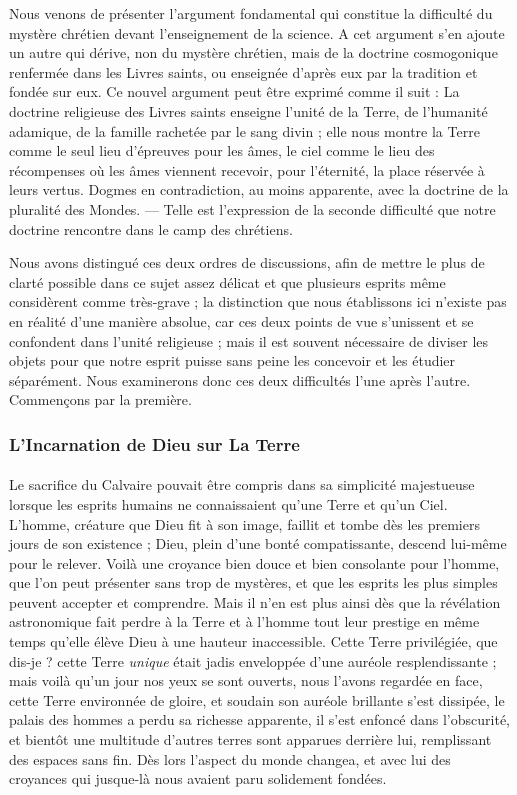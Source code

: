 \documentclass[a4paper, 11pt, oneside, landscape]{article}
\begin{document}
Nous venons de présenter l'argument fondamental qui constitue la difficulté du mystère chrétien devant l'enseignement de la science. A cet argument s'en ajoute un autre qui dérive, non du mystère chrétien, mais de la doctrine cosmogonique renfermée dans les Livres saints, ou enseignée d'après eux par la tradition et fondée sur eux. Ce nouvel argument peut être exprimé comme il suit : La doctrine religieuse des Livres saints enseigne l'unité de la Terre, de l'humanité adamique, de la famille rachetée par le sang divin ; elle nous montre la Terre comme le seul lieu d'épreuves pour les âmes, le ciel comme le lieu des récompenses où les âmes viennent recevoir, pour l'éternité, la place réservée à leurs vertus. Dogmes en contradiction, au moins apparente, avec la doctrine de la pluralité des Mondes. --- Telle est l'expression de la seconde difficulté que notre doctrine rencontre dans le camp des chrétiens.

Nous avons distingué ces deux ordres de discussions, afin de mettre le plus de clarté possible dans ce sujet assez délicat et que plusieurs esprits même considèrent comme très-grave ; la distinction que nous établissons ici n'existe pas en réalité d'une manière absolue, car ces deux points de vue s'unissent et se confondent dans l'unité religieuse ; mais il est souvent nécessaire de diviser les objets pour que notre esprit puisse sans peine les concevoir et les étudier séparément. Nous examinerons donc ces deux difficultés l'une après l'autre. Commençons par la première.

\subsubsection{L'Incarnation de Dieu sur La Terre}
\paragraph{}
Le sacrifice du Calvaire pouvait être compris dans sa simplicité majestueuse lorsque les esprits humains ne connaissaient qu'une Terre et qu'un Ciel. L'homme, créature que Dieu fit à son image, faillit et tombe dès les premiers jours de son existence ; Dieu, plein d'une bonté compatissante, descend lui-même pour le relever. Voilà une croyance bien douce et bien consolante pour l'homme, que l'on peut présenter sans trop de mystères, et que les esprits les plus simples peuvent accepter et comprendre. Mais il n'en est plus ainsi dès que la révélation astronomique fait perdre à la Terre et à l'homme tout leur prestige en même temps qu'elle élève Dieu à une hauteur inaccessible. Cette Terre privilégiée, que dis-je ? cette Terre \emph{unique} était jadis enveloppée d'une auréole resplendissante ; mais voilà qu'un jour nos yeux se sont ouverts, nous l'avons regardée en face, cette Terre environnée de gloire, et soudain son auréole brillante s'est dissipée, le palais des hommes a perdu sa richesse apparente, il s'est enfoncé dans l'obscurité, et bientôt une multitude d'autres terres sont apparues derrière lui, remplissant des espaces sans fin. Dès lors l'aspect du monde changea, et avec lui des croyances qui jusque-là nous avaient paru solidement fondées.
\end{document}
